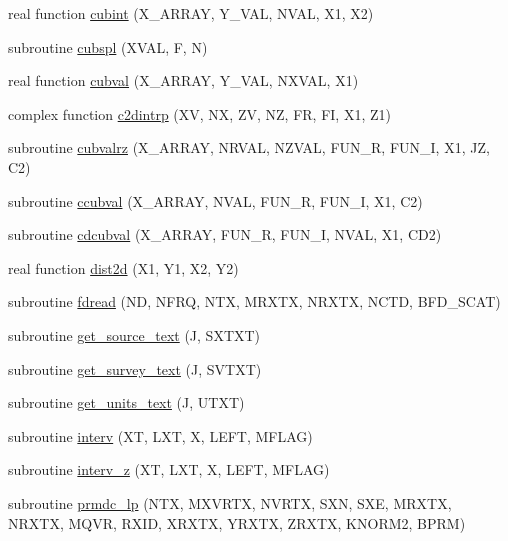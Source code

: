 \begin{DoxyCompactItemize}
\item 
real function \hyperlink{Leroi__c_8f90_aee021b0986763ff84e2a9373cd2c5b9f}{cubint} (X\+\_\+\+A\+R\+R\+AY, Y\+\_\+\+V\+AL, N\+V\+AL, X1, X2)
\item 
subroutine \hyperlink{Leroi__c_8f90_a836d1cb8acb3544a3a9fa63433efc1b6}{cubspl} (X\+V\+AL, F, N)
\item 
real function \hyperlink{Leroi__c_8f90_a7cfee47c046d9dadca7ccd1059bd30ac}{cubval} (X\+\_\+\+A\+R\+R\+AY, Y\+\_\+\+V\+AL, N\+X\+V\+AL, X1)
\item 
complex function \hyperlink{Leroi__c_8f90_ab444c66af8ac23d415864bbbd3ff9872}{c2dintrp} (XV, NX, ZV, NZ, FR, FI, X1, Z1)
\item 
subroutine \hyperlink{Leroi__c_8f90_a7ac3bb5f2b2d31402aa81424ee2be857}{cubvalrz} (X\+\_\+\+A\+R\+R\+AY, N\+R\+V\+AL, N\+Z\+V\+AL, F\+U\+N\+\_\+R, F\+U\+N\+\_\+I, X1, JZ, C2)
\item 
subroutine \hyperlink{Leroi__c_8f90_a5a4be24a4461d42dc9be5d5388c4d366}{ccubval} (X\+\_\+\+A\+R\+R\+AY, N\+V\+AL, F\+U\+N\+\_\+R, F\+U\+N\+\_\+I, X1, C2)
\item 
subroutine \hyperlink{Leroi__c_8f90_ab28d8a79c971f683b68fae4db0553909}{cdcubval} (X\+\_\+\+A\+R\+R\+AY, F\+U\+N\+\_\+R, F\+U\+N\+\_\+I, N\+V\+AL, X1, C\+D2)
\item 
real function \hyperlink{Leroi__c_8f90_a173fbca69518ee77703afb9c67d3e4f0}{dist2d} (X1, Y1, X2, Y2)
\item 
subroutine \hyperlink{Leroi__c_8f90_a51b5dc154d226d9db8556fde47af7ae9}{fdread} (ND, N\+F\+RQ, N\+TX, M\+R\+X\+TX, N\+R\+X\+TX, N\+C\+TD, B\+F\+D\+\_\+\+S\+C\+AT)
\item 
subroutine \hyperlink{Leroi__c_8f90_afc048db626c18fa128abba7a8c2100f6}{get\+\_\+source\+\_\+text} (J, S\+X\+T\+XT)
\item 
subroutine \hyperlink{Leroi__c_8f90_a602ef79dc6e8eaec1a5e258d5a385ae9}{get\+\_\+survey\+\_\+text} (J, S\+V\+T\+XT)
\item 
subroutine \hyperlink{Leroi__c_8f90_a5297bfa86ffada4b884da99673085b6a}{get\+\_\+units\+\_\+text} (J, U\+T\+XT)
\item 
subroutine \hyperlink{Leroi__c_8f90_ab3d44a77ee1868f9a09dcac7e6bfcdce}{interv} (XT, L\+XT, X, L\+E\+FT, M\+F\+L\+AG)
\item 
subroutine \hyperlink{Leroi__c_8f90_a94be7a783132491a0e0694c462d979b5}{interv\+\_\+z} (XT, L\+XT, X, L\+E\+FT, M\+F\+L\+AG)
\item 
subroutine \hyperlink{Leroi__c_8f90_a2332afca7e33269a0f374989bededf94}{prmdc\+\_\+lp} (N\+TX, M\+X\+V\+R\+TX, N\+V\+R\+TX, S\+XN, S\+XE, M\+R\+X\+TX, N\+R\+X\+TX, M\+Q\+VR, R\+X\+ID, X\+R\+X\+TX, Y\+R\+X\+TX, Z\+R\+X\+TX, K\+N\+O\+R\+M2, B\+P\+RM)

\end{DoxyCompactItemize}
